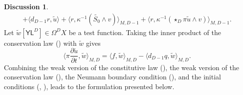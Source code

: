 \documentclass{elsarticle}
\theoremstyle{definition}
\newtheorem{discussion}[theorem]{Discussion}
\newcommand{\inner}[2]{\langle#1,#2\rangle}
\newcommand{\potential}{\mathsf{Y}}
\newcommand{\length}{\mathsf{L}}
\begin{document}
\begin{discussion}
\begin{equation}
\begin{split}
        + \inner{d_{D - 1} r}{\tilde{u}}
        + \inner{r}{\kappa^{-1} (\widetilde{S_0} \wedge v)}_{M, D - 1}
        + \inner{r}{\kappa^{-1} (\star_D \pi \widetilde{u} \wedge v)}_{M, D - 1}.
    \end{split}
  \end{equation}
  Let $\widetilde{w} [\potential \length^D] \in \Omega^D X$ be a test function.
  Taking the inner product of the conservation law () with $\widetilde{w}$ gives
  \begin{equation}
    \label{eq:continuum/mixed_weak/conservation_law}
    \inner{\pi \frac{\partial \widetilde{u}}{\partial t}}{\widetilde{w}}_{M, D}
    = \inner{f}{\widetilde{w}}_{M, D} - \inner{d_{D - 1} q}{\widetilde{w}}_{M, D}.
  \end{equation}
  Combining the weak version of the constitutive law (),
  the weak version of the conservation law (),
  the Neumann boundary condition (),
  and the initial conditions (, ),
  leads to the formulation presented below.
\end{discussion}
\end{document}
